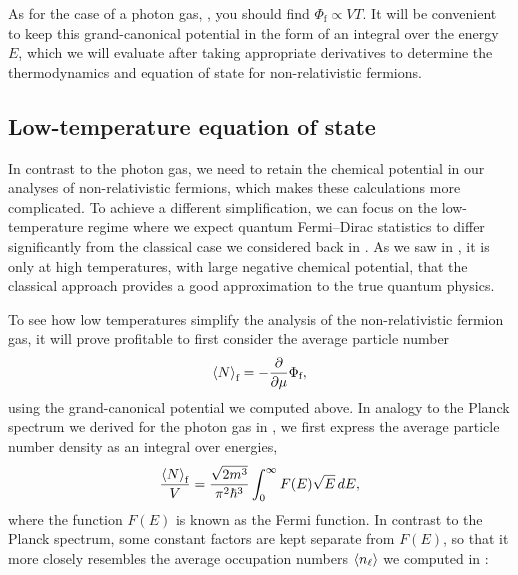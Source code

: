 As for the case of a photon gas, , you should find $\Phi_{\text{f}} \propto VT$.
It will be convenient to keep this grand-canonical potential in the form of an integral over the energy $E$, which we will evaluate after taking appropriate derivatives to determine the thermodynamics and equation of state for non-relativistic fermions.



\subsection{\label{sec:fermi_lowT}Low-temperature equation of state}
In contrast to the photon gas, we need to retain the chemical potential in our analyses of non-relativistic fermions, which makes these calculations more complicated.
To achieve a different simplification, we can focus on the low-temperature regime where we expect quantum Fermi--Dirac statistics to differ significantly from the classical case we considered back in .
As we saw in , it is only at high temperatures, with large negative chemical potential, that the classical approach provides a good approximation to the true quantum physics.

To see how low temperatures simplify the analysis of the non-relativistic fermion gas, it will prove profitable to first consider the average particle number
\begin{equation*}
  \left\langle N \right\rangle_{\text{f}} = -\frac{\partial }{\partial \mu} \Phi_{\text{f}},
\end{equation*}
using the grand-canonical potential we computed above.
In analogy to the Planck spectrum we derived for the photon gas in , we first express the average particle number density as an integral over energies,
\begin{equation}
  \label{eq:N_fermi}
  \frac{\left\langle N \right\rangle_{\text{f}}}{V} = \frac{\sqrt{2m^3}}{\pi^2 \hbar^3} \int_0^{\infty} F(E) \sqrt{E} \mathop{dE},
\end{equation}
where the function $F(E)$ is known as the Fermi function.
In contrast to the Planck spectrum, some constant factors are kept separate from $F(E)$, so that it more closely resembles the average occupation numbers $\left\langle n_{\ell} \right\rangle$ we computed in :
\begin{mdframed}
  \ \\[100 pt]
\end{mdframed}

